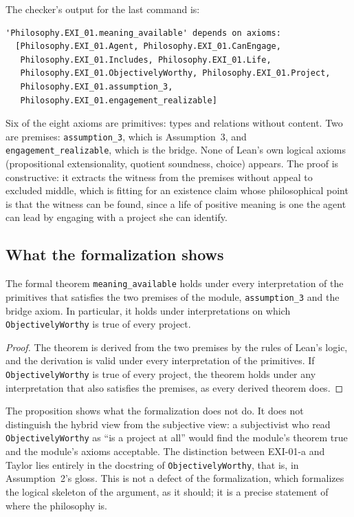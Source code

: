 The checker's output for the last command is:

\begin{lstlisting}
'Philosophy.EXI_01.meaning_available' depends on axioms:
  [Philosophy.EXI_01.Agent, Philosophy.EXI_01.CanEngage,
   Philosophy.EXI_01.Includes, Philosophy.EXI_01.Life,
   Philosophy.EXI_01.ObjectivelyWorthy, Philosophy.EXI_01.Project,
   Philosophy.EXI_01.assumption_3,
   Philosophy.EXI_01.engagement_realizable]
\end{lstlisting}

Six of the eight axioms are primitives: types and relations without content. Two are premises: \texttt{assumption\_3}, which is Assumption~3, and \texttt{engagement\_realizable}, which is the bridge. None of Lean's own logical axioms (propositional extensionality, quotient soundness, choice) appears. The proof is constructive: it extracts the witness from the premises without appeal to excluded middle, which is fitting for an existence claim whose philosophical point is that the witness can be found, since a life of positive meaning is one the agent can lead by engaging with a project she can identify.

\subsection{What the formalization shows}

\begin{proposition}\label{p:neutralfml}
The formal theorem \texttt{meaning\_available} holds under every interpretation of the primitives that satisfies the two premises of the module, \texttt{assumption\_3} and the bridge axiom. In particular, it holds under interpretations on which \texttt{ObjectivelyWorthy} is true of every project.
\end{proposition}

\begin{proof}
The theorem is derived from the two premises by the rules of Lean's logic, and the derivation is valid under every interpretation of the primitives. If \texttt{ObjectivelyWorthy} is true of every project, the theorem holds under any interpretation that also satisfies the premises, as every derived theorem does.
\end{proof}

The proposition shows what the formalization does not do. It does not distinguish the hybrid view from the subjective view: a subjectivist who read \texttt{ObjectivelyWorthy} as \enquote{is a project at all} would find the module's theorem true and the module's axioms acceptable. The distinction between EXI-01-a and Taylor lies entirely in the docstring of \texttt{ObjectivelyWorthy}, that is, in Assumption~2's gloss. This is not a defect of the formalization, which formalizes the logical skeleton of the argument, as it should; it is a precise statement of where the philosophy is.

